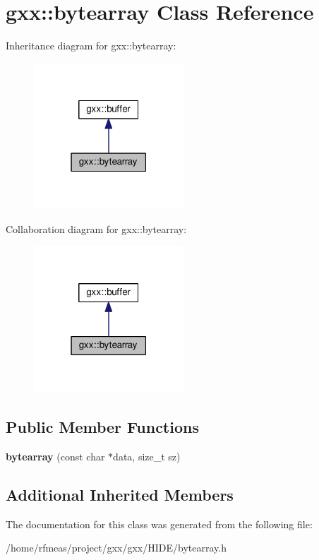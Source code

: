 \hypertarget{classgxx_1_1bytearray}{}\section{gxx\+:\+:bytearray Class Reference}
\label{classgxx_1_1bytearray}


Inheritance diagram for gxx\+:\+:bytearray\+:
\nopagebreak
\begin{figure}[H]
\begin{center}
\leavevmode
\includegraphics[width=159pt]{classgxx_1_1bytearray__inherit__graph}
\end{center}
\end{figure}


Collaboration diagram for gxx\+:\+:bytearray\+:
\nopagebreak
\begin{figure}[H]
\begin{center}
\leavevmode
\includegraphics[width=159pt]{classgxx_1_1bytearray__coll__graph}
\end{center}
\end{figure}
\subsection*{Public Member Functions}
\begin{DoxyCompactItemize}
\item 
{\bfseries bytearray} (const char $\ast$data, size\+\_\+t sz)\hypertarget{classgxx_1_1bytearray_afcff02af3b1692e16a6db49d9303329e}{}\label{classgxx_1_1bytearray_afcff02af3b1692e16a6db49d9303329e}

\end{DoxyCompactItemize}
\subsection*{Additional Inherited Members}


The documentation for this class was generated from the following file\+:\begin{DoxyCompactItemize}
\item 
/home/rfmeas/project/gxx/gxx/\+H\+I\+D\+E/bytearray.\+h\end{DoxyCompactItemize}
